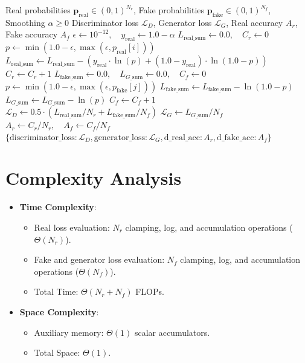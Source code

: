 \documentclass[11pt,a4paper]{article}
\theoremstyle{definition}
\begin{document}
\begin{algorithm}[H]
\caption{Generative Adversarial Network Forward Loss Computation}
\label{alg:gan}
\begin{algorithmic}[1]
\Require Real probabilities $\mathbf{p}_{\text{real}} \in (0, 1)^{N_r}$, Fake probabilities $\mathbf{p}_{\text{fake}} \in (0, 1)^{N_f}$, Smoothing $\alpha \ge 0$
\Ensure Discriminator loss $\mathcal{L}_D$, Generator loss $\mathcal{L}_G$, Real accuracy $A_r$, Fake accuracy $A_f$
\State $\epsilon \gets 10^{-12}, \quad y_{\text{real}} \gets 1.0 - \alpha$
\State $L_{\text{real\_sum}} \gets 0.0, \quad C_r \gets 0$
    \State $p \gets \min(1.0 - \epsilon, \max(\epsilon, p_{\text{real}}[i]))$
    \State $L_{\text{real\_sum}} \gets L_{\text{real\_sum}} - (y_{\text{real}} \cdot \ln(p) + (1.0 - y_{\text{real}}) \cdot \ln(1.0 - p))$
        \State $C_r \gets C_r + 1$
    \EndIf
\EndFor
\State $L_{\text{fake\_sum}} \gets 0.0, \quad L_{G\text{\_sum}} \gets 0.0, \quad C_f \gets 0$
    \State $p \gets \min(1.0 - \epsilon, \max(\epsilon, p_{\text{fake}}[j]))$
    \State $L_{\text{fake\_sum}} \gets L_{\text{fake\_sum}} - \ln(1.0 - p)$
    \State $L_{G\text{\_sum}} \gets L_{G\text{\_sum}} - \ln(p)$ 
        \State $C_f \gets C_f + 1$
    \EndIf
\EndFor
\State $\mathcal{L}_D \gets 0.5 \cdot (L_{\text{real\_sum}} / N_r + L_{\text{fake\_sum}} / N_f)$
\State $\mathcal{L}_G \gets L_{G\text{\_sum}} / N_f$
\State $A_r \gets C_r / N_r, \quad A_f \gets C_f / N_f$
\State \Return $\{\text{discriminator\_loss}: \mathcal{L}_D, \text{generator\_loss}: \mathcal{L}_G, \text{d\_real\_acc}: A_r, \text{d\_fake\_acc}: A_f\}$
\end{algorithmic}
\end{algorithm}

\section{Complexity Analysis}
\begin{itemize}
    \item \textbf{Time Complexity}:
    \begin{itemize}
        \item Real loss evaluation: $N_r$ clamping, log, and accumulation operations ($\Theta(N_r)$).
        \item Fake and generator loss evaluation: $N_f$ clamping, log, and accumulation operations ($\Theta(N_f)$).
        \item Total Time: $\Theta(N_r + N_f)$ FLOPs.
    \end{itemize}
    \item \textbf{Space Complexity}:
    \begin{itemize}
        \item Auxiliary memory: $\Theta(1)$ scalar accumulators.
        \item Total Space: $\Theta(1)$.
    \end{itemize}
\end{itemize}
\end{document}
